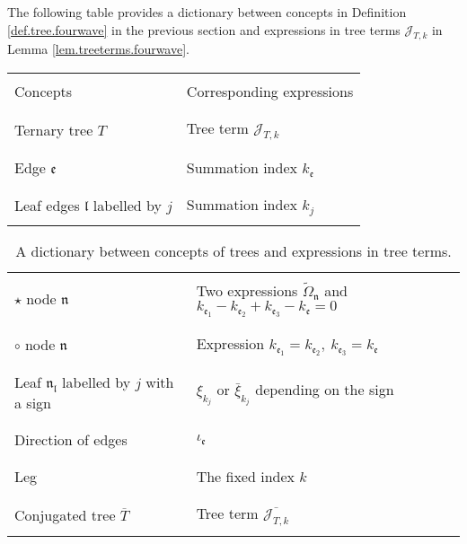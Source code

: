 The following table provides a dictionary between concepts in Definition \ref{def.tree.fourwave} in the previous section and expressions in tree terms $\mathcal{J}_{T,k}$ in Lemma \ref{lem.treeterms.fourwave}.

\begin{table}[H]
\begin{center}
 \begin{longtable}{|p{6cm}|p{8cm}|}
 \hline
 & \\
 Concepts & Corresponding expressions \\
 & \\
 \hline
 & \\
 Ternary tree $T$ & Tree term $\mathcal{J}_{T,k}$\\
 & \\
 \hline
 & \\
 Edge $\mathfrak{e}$ & Summation index $k_{\mathfrak{e}}$\\
 & \\
 \hline
 & \\
 Leaf edges $\mathfrak{l}$ labelled by $j$ & Summation index $k_{j}$\\
 & \\
 \hline
\end{longtable}
\end{center}
\end{table}

 \begin{table}[H]
    \begin{center}
     \begin{longtable}{|p{6cm}|p{8cm}|}
     \hline
 & \\
 $\star$ node $\mathfrak{n}$ & Two expressions $\widetilde{\Omega}_{\mathfrak{n}}$ and $k_{\mathfrak{e}_1}-k_{\mathfrak{e}_2}+k_{\mathfrak{e}_3}-k_{\mathfrak{e}}=0$\\
 & \\
 \hline
 & \\
 $\circ$ node $\mathfrak{n}$ & Expression $k_{\mathfrak{e}_1}=k_{\mathfrak{e}_2},\ k_{\mathfrak{e}_3}=k_{\mathfrak{e}}$\\
 & \\
 \hline
 & \\
 Leaf $\mathfrak{n}_{\mathfrak{l}}$ labelled by $j$ with a sign & $\xi_{k_j}$ or $\bar{\xi}_{k_j}$ depending on the sign\\
 & \\
 \hline
 & \\
 Direction of edges & $\iota_{\mathfrak{e}}$\\
 & \\
 \hline
 & \\
 Leg & The fixed index $k$\\
 & \\
 \hline
 & \\
 Conjugated tree $\overline{T}$ & Tree term $\overline{\mathcal{J}_{T,k}}$ \\
 & \\
 \hline
 \end{longtable}
\end{center}
\caption{\label{tab.dict.fourwave} A dictionary between concepts of trees and expressions in tree terms.}
\end{table}

